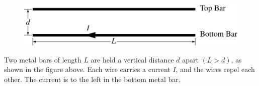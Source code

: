 %
\begin{figure}[H]
\centering
\includegraphics[scale=0.3]{images/img-017-029.png}
\end{figure}


\question
Two metal bars of length $L$ are held a vertical distance $d$ apart $(L>d)$, as shown in the figure above. Each wire carries a current $I$, and the wires repel each other. The current is to the left in the bottom metal bar. %

